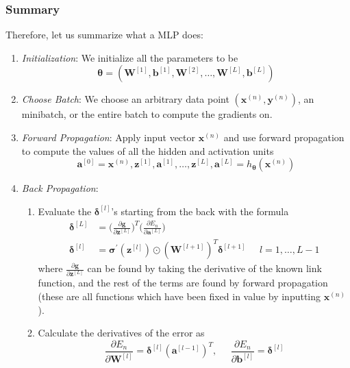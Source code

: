 \documentclass{article}
\theoremstyle{definition}
\theoremstyle{remark}
\theoremstyle{definition}
\begin{document}
\subsubsection{Summary}

Therefore, let us summarize what a MLP does: 
\begin{enumerate}
    \item \textit{Initialization}: We initialize all the parameters to be 
    \[\boldsymbol{\theta} = (\mathbf{W}^{[1]}, \mathbf{b}^{[1]}, \mathbf{W}^{[2]}, \ldots, \mathbf{W}^{[L]}, \mathbf{b}^{[L]})\]
    
    \item \textit{Choose Batch}: We choose an arbitrary data point $(\mathbf{x}^{(n)}, \mathbf{y}^{(n)})$, an minibatch, or the entire batch to compute the gradients on. 
    
    \item \textit{Forward Propagation}: Apply input vector $\mathbf{x}^{(n)}$ and use forward propagation to compute the values of all the hidden and activation units 
    \[\mathbf{a}^{[0]} = \mathbf{x}^{(n)}, \mathbf{z}^{[1]}, \mathbf{a}^{[1]}, \ldots, \mathbf{z}^{[L]}, \mathbf{a}^{[L]} = h_{\boldsymbol{\theta}} (\mathbf{x}^{(n)})\]
    
    \item \textit{Back Propagation}: 
    \begin{enumerate}
        \item Evaluate the $\boldsymbol{\delta}^{[l]}$'s starting from the back with the formula 
        \begin{align*}
            \boldsymbol{\delta}^{[L]} & = \bigg( \frac{\partial \mathbf{g}}{\partial \mathbf{z}^{[L]}} \bigg)^T \bigg( \frac{\partial E_n}{\partial \mathbf{a}^{[L]}} \bigg) \\
            \boldsymbol{\delta}^{[l]} & = \boldsymbol{\sigma}^\prime (\mathbf{z}^{[l]}) \odot (\mathbf{W}^{[l+1]})^T \boldsymbol{\delta}^{[l+1]} \;\;\;\;\; l = 1, \ldots, L-1
        \end{align*}
        where $\frac{\partial \mathbf{g}}{\partial \mathbf{z}^{[L]}}$ can be found by taking the derivative of the known link function, and the rest of the terms are found by forward propagation (these are all functions which have been fixed in value by inputting $\mathbf{x}^{(n)}$).  

        \item Calculate the derivatives of the error as 
        \[\frac{\partial E_n}{\partial \mathbf{W}^{[l]}} = \boldsymbol{\delta}^{[l]} (\mathbf{a}^{[l-1]})^T, \;\;\;\;\; \frac{\partial E_n}{\partial \mathbf{b}^{[l]}} = \boldsymbol{\delta}^{[l]}\]
    \end{enumerate}
    

\end{enumerate}
\end{document}
